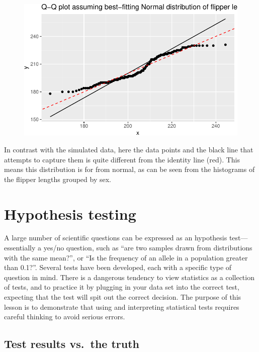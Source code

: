 \documentclass[
  letterpaper,
  DIV=11,
  numbers=noendperiod]{scrreprt}
\begin{document}
\begin{figure}[H]

{\centering \includegraphics{./04-distributions_files/figure-pdf/unnamed-chunk-21-2.pdf}

}

\end{figure}

In contrast with the simulated data, here the data points and the black
line that attempts to capture them is quite different from the identity
line (red). This means this distribution is for from normal, as can be
seen from the histograms of the flipper lengths grouped by sex.


\hypertarget{hypothesis-testing}{%
\chapter{Hypothesis testing}\label{hypothesis-testing}}

A large number of scientific questions can be expressed as an hypothesis
test---essentially a yes/no question, such as ``are two samples drawn
from distributions with the same mean?'', or ``Is the frequency of an
allele in a population greater than 0.1?''. Several tests have been
developed, each with a specific type of question in mind. There is a
dangerous tendency to view statistics as a collection of tests, and to
practice it by plugging in your data set into the correct test,
expecting that the test will spit out the correct decision. The purpose
of this lesson is to demonstrate that using and interpreting statistical
tests requires careful thinking to avoid serious errors.

\hypertarget{test-results-vs.-the-truth}{%
\section{Test results vs.~the truth}\label{test-results-vs.-the-truth}}
\end{document}
